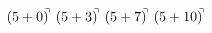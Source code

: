 \documentclass[preview]{standalone}
\begin{document}
\begin{align*}
(5+0)^{\hspace{-0.1cm}\urcorner} \ (5+3)^{\hspace{-0.1cm}\urcorner} \ (5+7)^{\hspace{-0.1cm}\urcorner} \ (5+10)^{\hspace{-0.1cm}\urcorner}
\end{align*}
\end{document}
